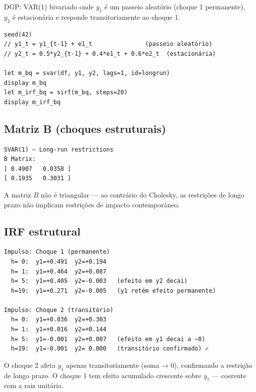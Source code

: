 DGP: VAR(1) bivariado onde $y_1$ é um passeio aleatório (choque 1 permanente),
$y_2$ é estacionária e responde transitoriamente ao choque 1.

\begin{lstlisting}[caption={SVAR Blanchard-Quah}]
seed(42)
// y1_t = y1_{t-1} + e1_t               (passeio aleatório)
// y2_t = 0.5*y2_{t-1} + 0.4*e1_t + 0.6*e2_t  (estacionária)

let m_bq = svar(df, y1, y2, lags=1, id=longrun)
display m_bq
let m_irf_bq = sirf(m_bq, steps=20)
display m_irf_bq
\end{lstlisting}

\subsection*{Matriz B (choques estruturais)}

\begin{lstlisting}[language={}, basicstyle=\ttfamily\small, frame=none,
  numbers=none, backgroundcolor=\color{codbg}]
SVAR(1) — Long-run restrictions
B Matrix:
[ 0.4907   0.0358 ]
[ 0.1935   0.3031 ]
\end{lstlisting}

A matriz $B$ não é triangular — ao contrário do Cholesky, as restrições de
longo prazo não implicam restrições de impacto contemporâneo.

\subsection*{IRF estrutural}

\begin{lstlisting}[language={}, basicstyle=\ttfamily\small, frame=none,
  numbers=none, backgroundcolor=\color{codbg}]
Impulso: Choque 1 (permanente)
  h= 0:  y1=+0.491  y2=+0.194
  h= 1:  y1=+0.464  y2=+0.087
  h= 5:  y1=+0.405  y2=-0.003   (efeito em y2 decai)
  h=19:  y1=+0.271  y2=-0.005   (y1 retém efeito permanente)

Impulso: Choque 2 (transitório)
  h= 0:  y1=+0.036  y2=+0.303
  h= 1:  y1=+0.016  y2=+0.144
  h= 5:  y1=-0.001  y2=+0.007   (efeito em y1 decai a ~0)
  h=19:  y1=-0.001  y2= 0.000   (transitório confirmado) ✓
\end{lstlisting}

O choque 2 afeta $y_1$ apenas transitoriamente (soma → 0), confirmando a
restrição de longo prazo. O choque 1 tem efeito acumulado crescente sobre $y_1$
— coerente com a raiz unitária.

